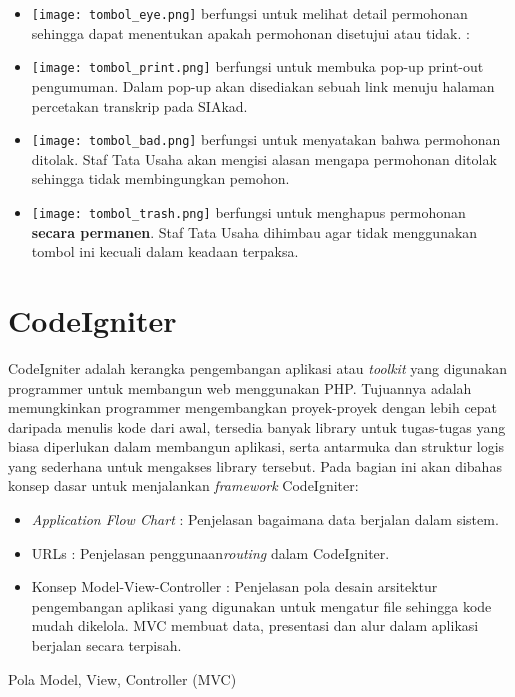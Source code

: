 \begin{itemize}
	\item \texttt{[image: tombol\_eye.png]} berfungsi untuk melihat detail permohonan sehingga dapat menentukan apakah permohonan disetujui atau tidak.
	: \item \texttt{[image: tombol\_print.png]} berfungsi untuk membuka pop-up print-out pengumuman. Dalam pop-up akan disediakan sebuah link menuju halaman percetakan transkrip pada SIAkad.
	\item \texttt{[image: tombol\_bad.png]} berfungsi untuk menyatakan bahwa permohonan ditolak. Staf Tata Usaha akan mengisi alasan mengapa permohonan ditolak sehingga tidak membingungkan pemohon.
	\item \texttt{[image: tombol\_trash.png]} berfungsi untuk menghapus permohonan \textbf{secara permanen}. Staf Tata Usaha dihimbau agar tidak menggunakan tombol ini kecuali dalam keadaan terpaksa.
\end{itemize}  

\section{CodeIgniter}
\label{sec:codeigniter}
CodeIgniter adalah kerangka pengembangan aplikasi atau \textit{toolkit} yang digunakan programmer untuk membangun web menggunakan PHP. Tujuannya adalah memungkinkan programmer mengembangkan proyek-proyek dengan lebih cepat daripada  menulis kode dari awal, tersedia banyak library untuk tugas-tugas yang biasa diperlukan dalam membangun aplikasi, serta antarmuka dan struktur logis yang sederhana untuk mengakses library tersebut. 
Pada bagian ini akan dibahas konsep dasar untuk menjalankan \textit{framework} CodeIgniter:
\begin{itemize}
	\item \textit{Application Flow Chart} : Penjelasan bagaimana data berjalan dalam sistem.
	\item URLs : Penjelasan penggunaan\textit{routing} dalam CodeIgniter.
	\item Konsep Model-View-Controller : Penjelasan pola desain arsitektur pengembangan aplikasi yang digunakan untuk mengatur file sehingga kode mudah dikelola. MVC membuat data, presentasi dan alur dalam aplikasi berjalan secara terpisah.
\end{itemize}
Pola Model, View, Controller (MVC) 

